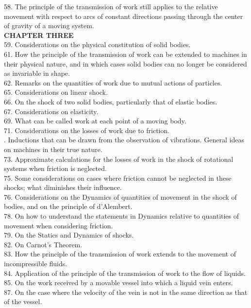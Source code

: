 \documentclass{book}
\begin{document}
58. The principle of the transmission of work still applies to the relative movement with respect to arcs of constant directions passing through the center of gravity of a moving system. \\
\textbf{CHAPTER THREE} \\
59. Considerations on the physical constitution of solid bodies. \\
61. How the principle of the transmission of work can be extended to machines in their physical nature, and in which cases solid bodies can no longer be considered as invariable in shape. \\
62. Remarks on the quantities of work due to mutual actions of particles. \\
65. Considerations on linear shock. \\
66. On the shock of two solid bodies, particularly that of elastic bodies. \\
67. Considerations on elasticity. \\
69. What can be called work at each point of a moving body. \\
71. Considerations on the losses of work due to friction. \\
. Inductions that can be drawn from the observation of vibrations. General ideas on machines in their true nature. \\
73. Approximate calculations for the losses of work in the shock of rotational systems when friction is neglected. \\
75. Some considerations on cases where friction cannot be neglected in these shocks; what diminishes their influence. \\
76. Considerations on the Dynamics of quantities of movement in the shock of bodies, and on the principle of d’Alembert. \\
78. On how to understand the statements in Dynamics relative to quantities of movement when considering friction. \\
79. On the Statics and Dynamics of shocks. \\
82. On Carnot's Theorem. \\
83. How the principle of the transmission of work extends to the movement of incompressible fluids. \\
84. Application of the principle of the transmission of work to the flow of liquids. \\
85. On the work received by a movable vessel into which a liquid vein enters. \\
87. On the case where the velocity of the vein is not in the same direction as that of the vessel. \\
\end{document}
